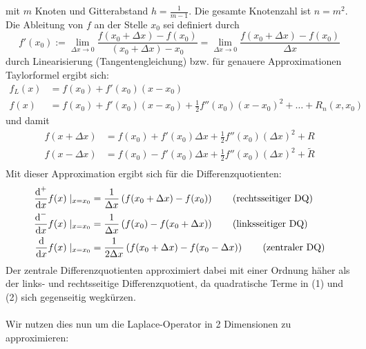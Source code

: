 \documentclass{article}
\begin{document}
\begin{egbox}
\begin{center}
        \end{center}
        mit $m$ Knoten und Gitterabstand $h=\tfrac{1}{m-1}$. Die gesamte Knotenzahl ist $n=m^2$. \\
        Die Ableitung von $f$ an der Stelle $x_0$ sei definiert durch
        \[f'(x_0) := 
        \lim_{\Delta x \rightarrow 0} \dfrac{f(x_0+\Delta x)-f(x_0)}{(x_0+\Delta x) - x_0} 
        = \lim_{\Delta x \rightarrow 0} \dfrac{f(x_0+\Delta x)-f(x_0)}{\Delta x} \]
        durch Linearisierung (Tangentengleichung) bzw. für genauere Approximationen Taylorformel ergibt sich:
        \begin{align*}
            f_L(x) &= f(x_0) + f'(x_0)(x-x_0) \\
            f(x) &= f(x_0) + f'(x_0)(x-x_0) + \tfrac{1}{2} f''(x_0)(x-x_0)^2 + \dotsc + R_n(x,x_0)
        \end{align*}
        und damit 
        \begin{align*}
            f(x+\Delta x) &= f(x_0) + f'(x_0)\Delta x + \tfrac{1}{2}f''(x_0)(\Delta x)^2 + R \tag{1}\\
            f(x-\Delta x) &= f(x_0) - f'(x_0)\Delta x + \tfrac{1}{2}f''(x_0)(\Delta x)^2 + \tilde{R} \tag{2} \\
        \end{align*}
        Mit dieser Approximation ergibt sich für die Differenzquotienten:
        \begin{align*}
            \dfrac{\diff^+}{\diff x} f(x)\mid_{x=x_0} &= \dfrac{1}{\Delta x}\left(f(x_0+\Delta x) - f(x_0)\right) 
            \tag{rechtsseitiger DQ}\\
            \dfrac{\diff^-}{\diff x} f(x)\mid_{x=x_0} &= \dfrac{1}{\Delta x}\left(f(x_0)-f(x_0+\Delta x)\right) 
            \tag{linksseitiger DQ}\\
            \dfrac{\diff}{\diff x} f(x)\mid_{x=x_0} 
            &= \dfrac{1}{2\Delta x}\left(f(x_0+\Delta x) - f(x_0-\Delta x)\right)\tag{zentraler DQ}
        \end{align*}
        Der zentrale Differenzquotienten approximiert dabei mit einer Ordnung häher als der links- und rechtsseitige 
        Differenzquotient, da quadratische Terme in (1) und (2) sich gegenseitig wegkürzen. \\ \\
        Wir nutzen dies nun um die Laplace-Operator in 2 Dimensionen zu approximieren: \\
        \begin{center}
\begin{tikzpicture}[scale=0.5, thick, every node/.style={font=\large}]


\end{tikzpicture}
\end{center}
\end{egbox}
\end{document}
